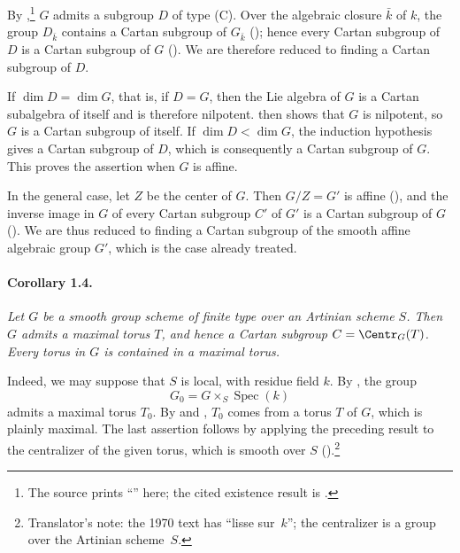 By ,\footnote{The source prints ``'' here; the cited
existence result is .} \(G\) admits a subgroup \(D\) of
type \textup{(C)}. Over the algebraic closure \(\bar k\) of \(k\),
the group \(D_{\bar k}\) contains a Cartan subgroup of
\(G_{\bar k}\) \textup{()}; hence every Cartan subgroup
of \(D\) is a Cartan subgroup of \(G\) \textup{()}.
We are therefore reduced to finding a Cartan subgroup of \(D\).

If \(\dim D=\dim G\), that is, if \(D=G\), then the Lie algebra of
\(G\) is a Cartan subalgebra of itself and is therefore nilpotent.
 then shows that \(G\) is nilpotent, so \(G\) is a Cartan
subgroup of itself. If \(\dim D<\dim G\), the induction hypothesis
gives a Cartan subgroup of \(D\), which is consequently a Cartan
subgroup of \(G\). This proves the assertion when \(G\) is affine.

In the general case, let \(Z\) be the center of \(G\). Then
\(G/Z=G'\) is affine \textup{()}, and the inverse image in
\(G\) of every Cartan subgroup \(C'\) of \(G'\) is a Cartan
subgroup of \(G\) \textup{()}. We are thus reduced to
finding a Cartan subgroup of the smooth affine algebraic group
\(G'\), which is the case already treated.

\paragraph{\textbf{Corollary 1.4.}}
\emph{Let \(G\) be a smooth group scheme of finite type over an
Artinian scheme \(S\). Then \(G\) admits a maximal torus \(T\), and
hence a Cartan subgroup \(C=\Centr_G(T)\). Every torus in \(G\) is
contained in a maximal torus.}

Indeed, we may suppose that \(S\) is local, with residue field
\(k\). By , the group
\[
  G_0=G\times_S\operatorname{Spec}(k)
\]
admits a maximal torus \(T_0\). By  and , \(T_0\)
comes from a torus \(T\) of \(G\), which is plainly maximal. The
last assertion follows by applying the preceding result to the
centralizer of the given torus, which is smooth over \(S\)
\textup{()}.\footnote{Translator's note: the 1970 text has ``lisse sur~\(k\)''; the centralizer is a group over the Artinian scheme~\(S\).}

